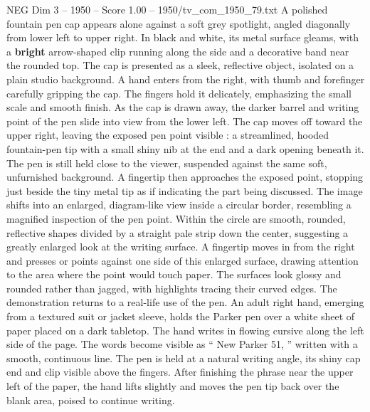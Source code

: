 \begin{textsample}{NEG Dim 3 – 1950 – Score 1.00 – 1950/tv\_com\_1950\_79.txt}  \label{ex:f3_neg_086}
A polished fountain pen cap appears alone against a soft grey spotlight, angled diagonally from lower left to upper right.
In black and white, its metal surface gleams, with a \textbf{bright} arrow-shaped clip running along the side and a decorative band near the rounded top.
The cap is presented as a sleek, reflective object, isolated on a plain studio background.
A hand enters from the right, with thumb and forefinger carefully gripping the cap.
The fingers hold it delicately, emphasizing the small scale and smooth finish.
As the cap is drawn away, the darker barrel and writing point of the pen slide into view from the lower left.
The cap moves off toward the upper right, leaving the exposed pen point visible : a streamlined, hooded fountain-pen tip with a small shiny nib at the end and a dark opening beneath it.
The pen is still held close to the viewer, suspended against the same soft, unfurnished background.
A fingertip then approaches the exposed point, stopping just beside the tiny metal tip as if indicating the part being discussed.
The image shifts into an enlarged, diagram-like view inside a circular border, resembling a magnified inspection of the pen point.
Within the circle are smooth, rounded, reflective shapes divided by a straight pale strip down the center, suggesting a greatly enlarged look at the writing surface.
A fingertip moves in from the right and presses or points against one side of this enlarged surface, drawing attention to the area where the point would touch paper.
The surfaces look glossy and rounded rather than jagged, with highlights tracing their curved edges.
The demonstration returns to a real-life use of the pen.
An adult right hand, emerging from a textured suit or jacket sleeve, holds the Parker pen over a white sheet of paper placed on a dark tabletop.
The hand writes in flowing cursive along the left side of the page.
The words become visible as “ New Parker 51, ” written with a smooth, continuous line.
The pen is held at a natural writing angle, its shiny cap end and clip visible above the fingers.
After finishing the phrase near the upper left of the paper, the hand lifts slightly and moves the pen tip back over the blank area, poised to continue writing.

\end{textsample}
